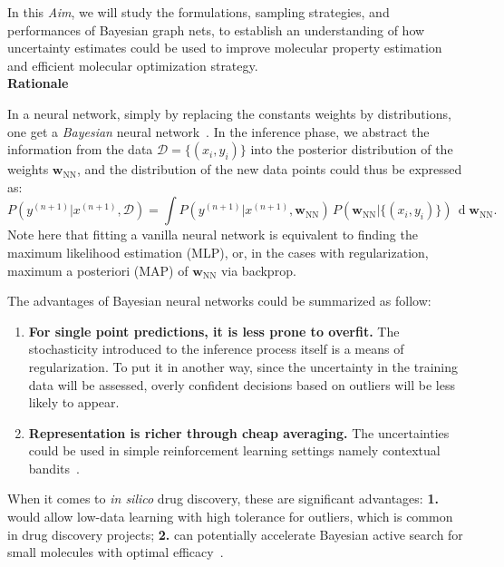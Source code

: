 \documentclass[11pt]{article}
\begin{document}
In this \textit{Aim}, we will study the formulations, sampling strategies, and performances of Bayesian graph nets, to establish an understanding of how uncertainty estimates could be used to improve molecular property estimation and efficient molecular optimization strategy.\\
    
\noindent\textbf{Rationale}

In a neural network, simply by replacing the constants weights by distributions, one get a \textit{Bayesian} neural network~\cite{blundell2015weight, neal2012bayesian}. 
In the inference phase, we abstract the information from the data $\mathcal{D} = \{(x_i, y_i)\}$ into the posterior distribution of the weights $\mathbf{w}_\text{NN}$, and the distribution of the new data points could thus be expressed as:
\begin{equation}
P(y^{(n+1)}|x^{(n+1)}, \mathcal{D}) = \int P(y^{(n+1)}|x^{(n+1)}, \mathbf{w}_\text{NN}) \, P(\mathbf{w}_\text{NN} | \{(x_i, y_i)\}) \, \operatorname{d}\mathbf{w}_\text{NN}.
\label{int}
\end{equation}
Note here that fitting a vanilla neural network is equivalent to finding the  maximum likelihood estimation (MLP), or, in the cases with regularization, maximum a posteriori (MAP) of $\mathbf{w}_\text{NN}$ via backprop.

The advantages of Bayesian neural networks could be summarized as follow:  
\begin{enumerate}
    \item \textbf{For single point predictions, it is less prone to overfit.} The stochasticity introduced to the inference process itself is a means of regularization. To put it in another way, since the uncertainty in the training data will be assessed, overly confident decisions based on outliers will be less likely to appear. 
    \item \textbf{Representation is richer through cheap averaging.} The uncertainties could be used in simple reinforcement learning settings namely contextual bandits~\cite{slivkins2014contextual}.
\end{enumerate}

When it comes to \textit{in silico} drug discovery, these are significant advantages: \textbf{1.} would allow low-data learning with high tolerance for outliers, which is common in drug discovery projects; \textbf{2.} can potentially accelerate Bayesian active search for small molecules with optimal efficacy~\cite{garnett2012bayesian}.
\end{document}
